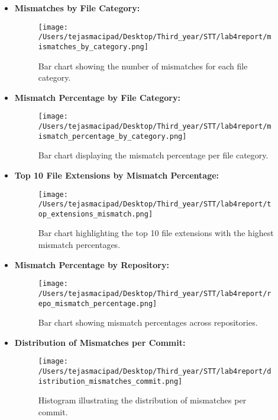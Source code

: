 \documentclass[12pt, a4paper]{report}
\begin{document}
\begin{enumerate}
\begin{itemize}
            \item \textbf{Mismatches by File Category:}  
            \begin{figure}[!h]
                \centering
                \texttt{[image: /Users/tejasmacipad/Desktop/Third\_year/STT/lab4report/mismatches\_by\_category.png]}
                \caption{Bar chart showing the number of mismatches for each file category.}
            \end{figure}

            \item \textbf{Mismatch Percentage by File Category:}  
            \begin{figure}[!h]
                \centering
                \texttt{[image: /Users/tejasmacipad/Desktop/Third\_year/STT/lab4report/mismatch\_percentage\_by\_category.png]}
                \caption{Bar chart displaying the mismatch percentage per file category.}
            \end{figure}

            \item \textbf{Top 10 File Extensions by Mismatch Percentage:}  
            \begin{figure}[!h]
                \centering
                \texttt{[image: /Users/tejasmacipad/Desktop/Third\_year/STT/lab4report/top\_extensions\_mismatch.png]}
                \caption{Bar chart highlighting the top 10 file extensions with the highest mismatch percentages.}
            \end{figure}

            \item \textbf{Mismatch Percentage by Repository:}  
            \begin{figure}[!h]
                \centering
                \texttt{[image: /Users/tejasmacipad/Desktop/Third\_year/STT/lab4report/repo\_mismatch\_percentage.png]}
                \caption{Bar chart showing mismatch percentages across repositories.}
            \end{figure}

            \item \textbf{Distribution of Mismatches per Commit:}  
            \begin{figure}[!h]
                \centering
                \texttt{[image: /Users/tejasmacipad/Desktop/Third\_year/STT/lab4report/distribution\_mismatches\_commit.png]}
                \caption{Histogram illustrating the distribution of mismatches per commit.}
            \end{figure}


\end{itemize}
\end{enumerate}
\end{document}
